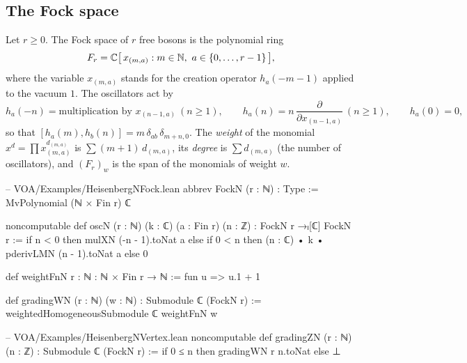 \subsection{The Fock space}

\begin{definition}\label{ch04:def:fock}
Let $r\ge0$. The Fock space of $r$ free bosons is the polynomial ring
\begin{equation*}
  F_r=\C\big[\,x_{(m,a)} : m\in\N,\ a\in\{0,\dots,r-1\}\,\big],
\end{equation*}
where the variable $x_{(m,a)}$ stands for the creation operator $h_a(-m-1)$ applied to the vacuum
$1$. The oscillators act by
\begin{equation*}
  h_a(-n)=\text{multiplication by }x_{(n-1,a)}\ (n\ge1),\qquad
  h_a(n)=n\,\frac{\partial}{\partial x_{(n-1,a)}}\ (n\ge1),\qquad h_a(0)=0,
\end{equation*}
so that $[h_a(m),h_b(n)]=m\,\delta_{ab}\,\delta_{m+n,0}$. The \emph{weight} of the monomial
$x^d=\prod x_{(m,a)}^{d_{(m,a)}}$ is $\sum (m+1)\,d_{(m,a)}$, its \emph{degree} is
$\sum d_{(m,a)}$ (the number of oscillators), and $(F_r)_w$ is the span of the monomials of
weight $w$.
\end{definition}

\begin{leancode}
-- VOA/Examples/HeisenbergNFock.lean
abbrev FockN (r : ℕ) : Type := MvPolynomial (ℕ × Fin r) ℂ

noncomputable def oscN (r : ℕ) (k : ℂ) (a : Fin r) (n : ℤ) : FockN r →ₗ[ℂ] FockN r :=
  if n < 0 then mulXN (-n - 1).toNat a
  else if 0 < n then (n : ℂ) • k • pderivLMN (n - 1).toNat a
  else 0

def weightFnN {r : ℕ} : ℕ × Fin r → ℕ := fun u => u.1 + 1

def gradingWN (r : ℕ) (w : ℕ) : Submodule ℂ (FockN r) :=
  weightedHomogeneousSubmodule ℂ weightFnN w

-- VOA/Examples/HeisenbergNVertex.lean
noncomputable def gradingZN (r : ℕ) (n : ℤ) : Submodule ℂ (FockN r) :=
  if 0 ≤ n then gradingWN r n.toNat else ⊥
\end{leancode}

